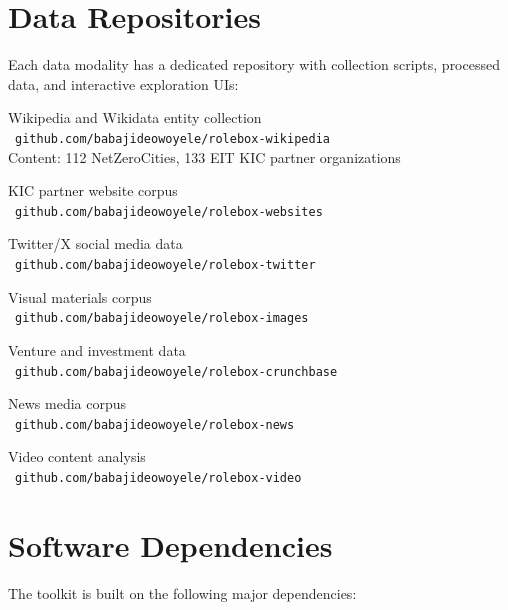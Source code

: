 \documentclass[../main.tex]{subfiles}
\begin{document}
\section{Data Repositories}

Each data modality has a dedicated repository with collection scripts, processed data, and interactive exploration UIs:

\begin{description}[leftmargin=0.5cm]

\item[rolebox-wikipedia] Wikipedia and Wikidata entity collection\\
\faGithub\ \texttt{github.com/babajideowoyele/rolebox-wikipedia}\\
Content: 112 NetZeroCities, 133 EIT KIC partner organizations

\item[rolebox-websites] KIC partner website corpus\\
\faGithub\ \texttt{github.com/babajideowoyele/rolebox-websites}

\item[rolebox-twitter] Twitter/X social media data\\
\faGithub\ \texttt{github.com/babajideowoyele/rolebox-twitter}

\item[rolebox-images] Visual materials corpus\\
\faGithub\ \texttt{github.com/babajideowoyele/rolebox-images}

\item[rolebox-crunchbase] Venture and investment data\\
\faGithub\ \texttt{github.com/babajideowoyele/rolebox-crunchbase}

\item[rolebox-news] News media corpus\\
\faGithub\ \texttt{github.com/babajideowoyele/rolebox-news}

\item[rolebox-video] Video content analysis\\
\faGithub\ \texttt{github.com/babajideowoyele/rolebox-video}

\end{description}

\section{Software Dependencies}

The toolkit is built on the following major dependencies:
\end{document}
